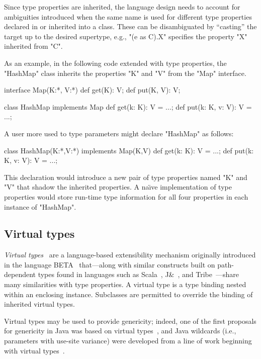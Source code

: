Since type properties are inherited, the language design needs
to account for ambiguities introduced when the same name is
used for different type properties declared in or inherited into a class.
These can be disambiguated
by ``casting'' the target up to the desired supertype,
e.g., \xcd"(e as C).X" specifies
the property \xcd"X" inherited from \xcd"C".

As an example, in the following \Xten code extended with type properties, the
\xcd"HashMap"  class inherits the properties \xcd"K" and \xcd"V" from the
\xcd"Map" interface.
\begin{xten}
interface Map(K:*, V:*) {
  def get(K): V;
  def put(K, V): V;
}

class HashMap implements Map {
  def get(k: K): V = ...;
  def put(k: K, v: V): V = ...;
}
\end{xten}
A user more used to type parameters might declare \xcd"HashMap" as follows:
\begin{xten}
class HashMap(K:*,V:*) implements Map(K,V) {
  def get(k: K): V = ...;
  def put(k: K, v: V): V = ...;
}
\end{xten}
This declaration would introduce a new pair of type properties
named \xcd"K" and
\xcd"V" that shadow the inherited properties.
A na{\"\i}ve implementation of type properties would store run-time
type information for all four properties in each instance
of \xcd"HashMap".


\subsection{Virtual types}

\emph{Virtual types}~\cite{beta,mp89-virtual-classes,ernst06-virtual}
are a language-based extensibility
mechanism 
originally introduced in the language
BETA~\cite{beta} that---along with
similar constructs built on path-dependent types found in
languages such as Scala~\cite{scala}, J\&~\cite{nqm06},
and Tribe~\cite{cdnw07-tribe}---share many similarities with type properties.
A virtual type is a type binding nested within an enclosing instance.
Subclasses are permitted to override the binding of inherited virtual types. 

Virtual types
may be used to provide genericity; indeed,
one of the first proposals for genericity in Java was based on
virtual types~\cite{thorup97}, and
Java
wildcards (i.e., parameters with use-site variance)
were developed from a line of work beginning with virtual
types~\cite{unifying-genericity,variant-parametric-types,adding-wildcards}.

